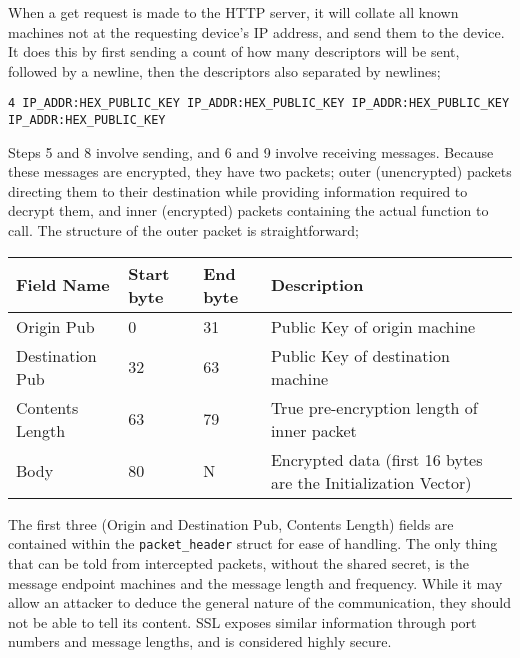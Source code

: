 \documentclass{article}
\begin{document}
When a get request is made to the HTTP server, it will collate all known machines not at the requesting device's IP address, and send them to the device. It does this by first sending a count of how many descriptors will be sent, followed by a newline, then the descriptors also separated by newlines;

\texttt{4 \newline
IP\_ADDR:HEX\_PUBLIC\_KEY \newline
IP\_ADDR:HEX\_PUBLIC\_KEY \newline
IP\_ADDR:HEX\_PUBLIC\_KEY \newline
IP\_ADDR:HEX\_PUBLIC\_KEY
}

Steps 5 and 8 involve sending, and 6 and 9 involve receiving messages. Because these messages are encrypted, they have two packets; outer (unencrypted) packets directing them to their destination while providing information required to decrypt them, and inner (encrypted) packets containing the actual function to call. The structure of the outer packet is straightforward;

\begin{table}[h]
\begin{tabular}{|p{25mm}|l|l|p{45mm}|}
\hline
\textbf{Field Name}	& \textbf{Start byte}	& \textbf{End byte}		& \textbf{Description} \\ \hline
Origin Pub					& 0									& 31							& Public Key of origin machine \\ \hline
Destination Pub			& 32								& 63							& Public Key of destination machine \\ \hline
Contents Length			& 63								& 79							& True pre-encryption length of inner packet \\ \hline
Body								& 80								& N								& Encrypted data (first 16 bytes are the Initialization Vector) \\ \hline
\end{tabular}
\end{table}

The first three (Origin and Destination Pub, Contents Length) fields are contained within the \texttt{packet\_header} struct for ease of handling. The only thing that can be told from intercepted packets, without the shared secret, is the message endpoint machines and the message length and frequency. While it may allow an attacker to deduce the general nature of the communication, they should not be able to tell its content. SSL exposes similar information through port numbers and message lengths, and is considered highly secure.
\end{document}
